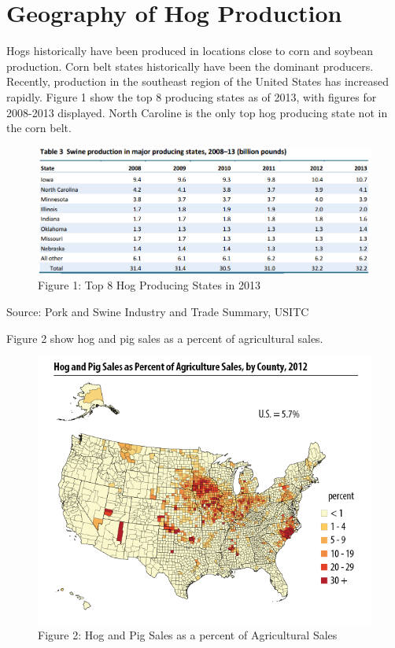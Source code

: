 \documentclass[]{book}
\theoremstyle{definition}
\theoremstyle{definition}
\theoremstyle{remark}
\begin{document}
\section{Geography of Hog Production}\label{geography-of-hog-production}

Hogs historically have been produced in locations close to corn and
soybean production. Corn belt states historically have been the dominant
producers. Recently, production in the southeast region of the United
States has increased rapidly. Figure 1 show the top 8 producing states
as of 2013, with figures for 2008-2013 displayed. North Caroline is the
only top hog producing state not in the corn belt.

\begin{figure}[htbp]
\centering
\includegraphics{images/hogstates.png}
\caption{Figure 1: Top 8 Hog Producing States in 2013}
\end{figure}

Source: Pork and Swine Industry and Trade Summary, USITC
\citep{usitctrade}

Figure 2 show hog and pig sales as a percent of agricultural sales.

\begin{figure}[htbp]
\centering
\includegraphics{images/hogprodvaluecounty.png}
\caption{Figure 2: Hog and Pig Sales as a percent of Agricultural Sales}
\end{figure}
\end{document}
